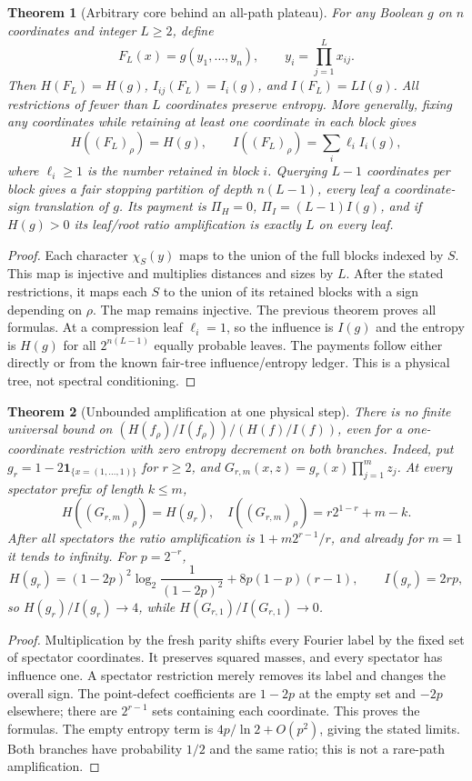 \documentclass{article}
\newtheorem{theorem}{Theorem}
\begin{document}
\begin{theorem}[Arbitrary core behind an all-path plateau]
For any Boolean $g$ on $n$ coordinates and integer $L\ge2$, define
\[
 F_L(x)=g(y_1,\ldots,y_n),\qquad y_i=\prod_{j=1}^L x_{ij}.
\]
Then $H(F_L)=H(g)$, $I_{ij}(F_L)=I_i(g)$, and $I(F_L)=LI(g)$.
All restrictions of fewer than $L$ coordinates preserve entropy.
More generally, fixing any coordinates while retaining at least one
coordinate in each block gives
\[
 H((F_L)_\rho)=H(g),\qquad
 I((F_L)_\rho)=\sum_i \ell_i I_i(g),
\]
where $\ell_i\ge1$ is the number retained in block $i$.
Querying $L-1$ coordinates per block gives a fair stopping partition
of depth $n(L-1)$, every leaf a coordinate-sign translation of $g$.
Its payment is $\Pi_H=0$, $\Pi_I=(L-1)I(g)$, and if $H(g)>0$ its
leaf/root ratio amplification is exactly $L$ on every leaf.
\end{theorem}
\begin{proof}
Each character $\chi_S(y)$ maps to the union of the full blocks
indexed by $S$. This map is injective and multiplies distances and
sizes by $L$. After the stated restrictions, it maps each $S$ to
the union of its retained blocks with a sign depending on $\rho$.
The map remains injective. The previous theorem proves all formulas.
At a compression leaf $\ell_i=1$, so the influence is $I(g)$ and
the entropy is $H(g)$ for all $2^{n(L-1)}$ equally probable leaves.
The payments follow either directly or from the known fair-tree
influence/entropy ledger. This is a physical tree, not spectral conditioning.
\end{proof}

\begin{theorem}[Unbounded amplification at one physical step]
There is no finite universal bound on
$(H(f_\rho)/I(f_\rho))/(H(f)/I(f))$, even for a one-coordinate
restriction with zero entropy decrement on both branches.
Indeed, put $g_r=1-2\mathbf1_{\{x=(1,\ldots,1)\}}$ for $r\ge2$,
and $G_{r,m}(x,z)=g_r(x)\prod_{j=1}^m z_j$.
At every spectator prefix of length $k\le m$,
\[
 H((G_{r,m})_\rho)=H(g_r),\quad
 I((G_{r,m})_\rho)=r2^{1-r}+m-k.
\]
After all spectators the ratio amplification is
$1+m2^{r-1}/r$, and already for $m=1$ it tends to infinity.
For $p=2^{-r}$,
\[
 H(g_r)=(1-2p)^2\log_2\frac1{(1-2p)^2}
          +8p(1-p)(r-1),\qquad I(g_r)=2rp,
\]
so $H(g_r)/I(g_r)\to4$, while $H(G_{r,1})/I(G_{r,1})\to0$.
\end{theorem}
\begin{proof}
Multiplication by the fresh parity shifts every Fourier label by the
fixed set of spectator coordinates. It preserves squared masses,
and every spectator has influence one. A spectator restriction merely
removes its label and changes the overall sign. The point-defect
coefficients are $1-2p$ at the empty set and $-2p$ elsewhere;
there are $2^{r-1}$ sets containing each coordinate. This proves the
formulas. The empty entropy term is $4p/\ln2+O(p^2)$,
giving the stated limits. Both branches have probability $1/2$ and
the same ratio; this is not a rare-path amplification.
\end{proof}
\end{document}
